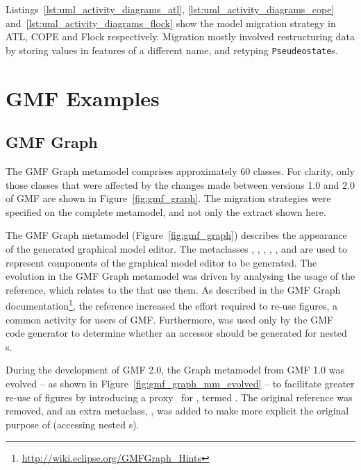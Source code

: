 Listings~\ref{lst:uml_activity_diagrams_atl}, \ref{lst:uml_activity_diagrams_cope} and~\ref{lst:uml_activity_diagrams_flock} show the model migration strategy in ATL, COPE and Flock respectively. Migration mostly involved restructuring data by storing values in features of a different name, and retyping \texttt{Pseudeostate}s.




\section{GMF Examples}

\subsection{GMF Graph}
\label{subsec:gmf_graph}

The GMF Graph metamodel comprises approximately 60 classes. For clarity, only those classes that were affected by the changes made between versions 1.0 and 2.0 of GMF are shown in Figure~\ref{fig:gmf_graph}. The migration strategies were specified on the complete metamodel, and not only the extract shown here.

The GMF Graph metamodel (Figure~\ref{fig:gmf_graph}) describes the appearance of the generated graphical model editor. The metaclasses , , , , , and  are used to represent components of the graphical model editor to be generated. The evolution in the GMF Graph metamodel was driven by analysing the usage of the  reference, which relates  to the  that use them. As described in the GMF Graph documentation\footnote{\url{http://wiki.eclipse.org/GMFGraph_Hints}}, the  reference increased the effort required to re-use figures, a common activity for users of GMF. Furthermore,  was used only by the GMF code generator to determine whether an accessor
should be generated for nested s.

During the development of GMF 2.0, the Graph metamodel from GMF 1.0 was evolved -- as shown in Figure~\ref{fig:gmf_graph_mm_evolved} -- to facilitate greater re-use of figures by introducing a proxy~\cite{gamma95patterns} for , termed . The original  reference was removed, and an extra metaclass, , was added to make more explicit the original purpose of  (accessing nested s).

